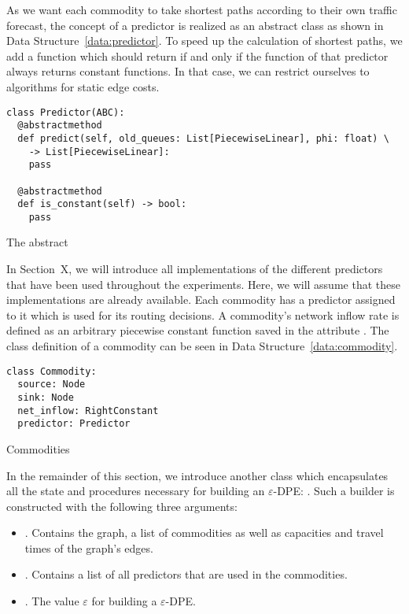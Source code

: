 As we want each commodity to take shortest paths according to their own traffic forecast, the concept of a predictor is realized as an abstract class as shown in Data Structure~\ref{data:predictor}.
 To speed up the calculation of shortest paths, we add a function  which should return  if and only if the  function of that predictor always returns constant functions.
In that case, we can restrict ourselves to algorithms for static edge costs.

\begin{classdef}
  \begin{verbatim}
class Predictor(ABC):
  @abstractmethod
  def predict(self, old_queues: List[PiecewiseLinear], phi: float) \
    -> List[PiecewiseLinear]:
    pass
  
  @abstractmethod
  def is_constant(self) -> bool:
    pass
\end{verbatim}
\caption{The abstract }
\label{data:predictor}
\end{classdef}


In Section~X, we will introduce all implementations of the different predictors that have been used throughout the experiments.
Here, we will assume that these implementations are already available.
Each commodity has a predictor assigned to it which is used for its routing decisions.
A commodity's network inflow rate is defined as an arbitrary piecewise constant function saved in the attribute . 
The class definition of a commodity can be seen in Data Structure~\ref{data:commodity}.

\begin{classdef}
    \begin{verbatim}
class Commodity:
  source: Node
  sink: Node
  net_inflow: RightConstant
  predictor: Predictor
\end{verbatim}
\caption{Commodities}%
\label{data:commodity}
\end{classdef}

In the remainder of this section, we introduce another class which encapsulates all the state and procedures necessary for building an $\varepsilon$-DPE: .
Such a builder is constructed with the following three arguments:
\begin{itemize}
  \item {}. Contains the graph, a list of commodities as well as capacities and travel times of the graph's edges.
  \item \code{predictors: List[Predictor]}. Contains a list of all predictors that are used in the commodities.
  \item \code{reroute_interval: float}. The value $\varepsilon$ for building a $\varepsilon$-DPE. 
\end{itemize}

